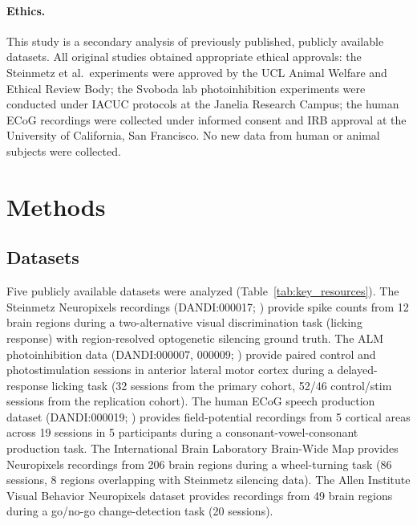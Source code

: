\documentclass[9pt,lineno]{elife}
\begin{document}
\paragraph{Ethics.} This study is a secondary analysis of previously published, publicly available datasets. All original studies obtained appropriate ethical approvals: the Steinmetz et al.\ experiments were approved by the UCL Animal Welfare and Ethical Review Body; the Svoboda lab photoinhibition experiments were conducted under IACUC protocols at the Janelia Research Campus; the human ECoG recordings were collected under informed consent and IRB approval at the University of California, San Francisco. No new data from human or animal subjects were collected.


\section{Methods}

\subsection{Datasets}
\label{sec:datasets}

Five publicly available datasets were analyzed (Table~\ref{tab:key_resources}). The Steinmetz Neuropixels recordings (DANDI:000017; \citealp{steinmetz2019distributed, zatkahaas2021}) provide spike counts from 12 brain regions during a two-alternative visual discrimination task (licking response) with region-resolved optogenetic silencing ground truth. The ALM photoinhibition data (DANDI:000007, 000009; \citealp{svoboda_alm}) provide paired control and photostimulation sessions in anterior lateral motor cortex during a delayed-response licking task (32 sessions from the primary cohort, 52/46 control/stim sessions from the replication cohort). The human ECoG speech production dataset (DANDI:000019; \citealp{dandi000019}) provides field-potential recordings from 5 cortical areas across 19 sessions in 5 participants during a consonant-vowel-consonant production task. The International Brain Laboratory Brain-Wide Map \citep{ibl2025brainwide} provides Neuropixels recordings from 206 brain regions during a wheel-turning task (86 sessions, 8 regions overlapping with Steinmetz silencing data). The Allen Institute Visual Behavior Neuropixels dataset \citep{siegle2021survey} provides recordings from 49 brain regions during a go/no-go change-detection task (20 sessions).
\end{document}
